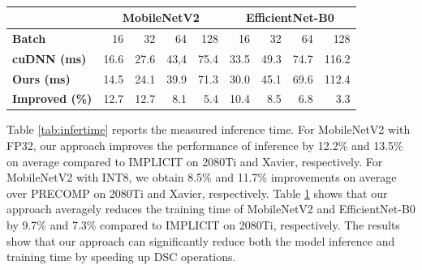 \begin{table}[]
\setlength{\tabcolsep}{4.4pt}
    \caption{}
    \vspace{-3mm}
    \label{tab:traintime}
    \centering
    \begin{threeparttable}
    \begin{tabular}{l|rrrr|rrrr}
    \toprule
    &\multicolumn{4}{c|}{MobileNetV2} & \multicolumn{4}{c}{EfficientNet-B0}\\
    \midrule
    \textbf{Batch} & 16& 32 &64 & 128& 16& 32 &64 & 128\\
    \midrule
    \textbf{cuDNN (ms)} & 16.6 & 27.6 & 43,4 &75.4& 33.5 & 49.3 & 74.7 &116.2 \\
    \textbf{Ours (ms)} & 14.5  &24.1 &39.9 &71.3& 30.0  &45.1 &69.6 &112.4\\
    \textbf{Improved (\%)} &12.7  &12.7 &8.1 &5.4 &10.4  &8.5 &6.8 &3.3\\
    \bottomrule
    \end{tabular}
    \footnotesize
    \end{threeparttable}
    \vspace{-5mm}
\end{table}

Table \ref{tab:infertime} reports the measured inference time. For MobileNetV2 with FP32, our approach improves the performance of
inference by 12.2\% and 13.5\% on average compared to IMPLICIT on 2080Ti and Xavier, respectively. For MobileNetV2 with INT8, we
obtain 8.5\% and 11.7\% improvements on average over PRECOMP on 2080Ti and Xavier, respectively. 
Table \ref{tab:traintime} shows that
our approach averagely reduces the training time of MobileNetV2 and EfficientNet-B0 by 9.7\% and 7.3\% compared to IMPLICIT on 2080Ti, respectively. The results show that our approach can
significantly reduce both the model inference and training time by speeding up DSC operations.
